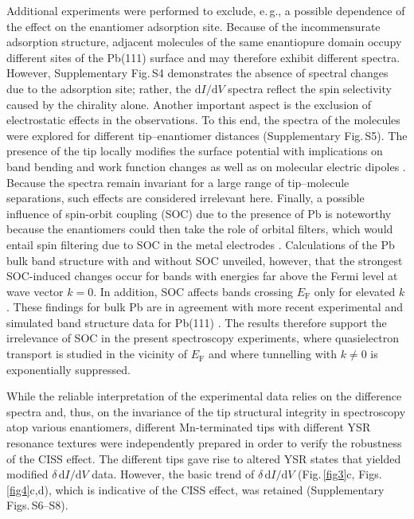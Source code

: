 \documentclass[aps,floatfix,12pt]{revtex4-2}
\begin{document}
Additional experiments were performed to exclude, e.\,g., a possible dependence of the effect on the enantiomer adsorption site.
Because of the incommensurate adsorption structure, adjacent molecules of the same enantiopure domain occupy different sites of the Pb(111) surface and may therefore exhibit different spectra.
However, Supplementary Fig.\,S4 demonstrates the absence of spectral changes due to the adsorption site; rather, the $\text{d}I/\text{d}V$ spectra reflect the spin selectivity caused by the chirality alone.
Another important aspect is the exclusion of electrostatic effects in the observations.
To this end, the spectra of the molecules were explored for different tip--enantiomer distances (Supplementary Fig.\,S5)\@.
The presence of the tip locally modifies the surface potential with implications on band bending and work function changes \cite{acsnano_18_6028} as well as on molecular electric dipoles \cite{natcommun_7_10744,chemsci_15_14905,jacs_147_36453}.
Because the spectra remain invariant for a large range of tip--molecule separations, such effects are considered irrelevant here.
Finally, a possible influence of spin-orbit coupling (SOC) due to the presence of Pb is noteworthy because the enantiomers could then take the role of orbital filters, which would entail spin filtering due to SOC in the metal electrodes \cite{natmater_20_638}.
Calculations of the Pb bulk band structure with and without SOC \cite{prb_84_115144} unveiled, however, that the strongest SOC-induced changes occur for bands with energies far above the Fermi level at wave vector $k=0$\@.
In addition, SOC affects bands crossing $E_\text{F}$ only for elevated $k$.
These findings for bulk Pb are in agreement with more recent experimental and simulated band structure data for Pb(111) \cite{scirep_13_1689}.
The results therefore support the irrelevance of SOC in the present spectroscopy experiments, where quasielectron transport is studied in the vicinity of $E_\text{F}$ and where tunnelling with $k\neq 0$ is exponentially suppressed.

While the reliable interpretation of the experimental data relies on the difference spectra and, thus, on the invariance of the tip structural integrity in spectroscopy atop various enantiomers, different Mn-terminated tips with different YSR resonance textures were independently prepared in order to verify the robustness of the CISS effect.
The different tips gave rise to altered YSR states that yielded modified $\delta\,\text{d}I/\text{d}V$ data.
However, the basic trend of $\delta\,\text{d}I/\text{d}V$ (Fig.\,\ref{fig3}c, Figs.\,\ref{fig4}c,d), which is indicative of the CISS effect, was retained (Supplementary Figs.\,S6--S8)\@.
\end{document}
